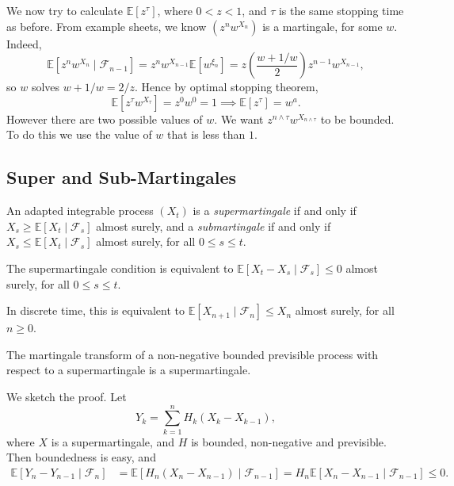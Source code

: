 \documentclass[12pt]{article}
\begin{document}
\begin{exbox}
	We now try to calculate $\mathbb{E}[z^{\tau}]$, where $0 < z < 1$, and $\tau$ is the same stopping time as before. From example sheets, we know $(z^n w^{X_n})$ is a martingale, for some $w$. Indeed,
	\[
	\mathbb{E}[z^n w^{X_n} \mid \mathcal{F}_{n-1}] = z^n w^{X_{n-1}} \mathbb{E}[w^{\xi_n}] = z \left( \frac{w + 1/w}{2} \right) z^{n-1} w^{X_{n-1}},
	\]
	so $w$ solves $w + 1/w = 2/z$. Hence by optimal stopping theorem,
	\[
	\mathbb{E}[z^\tau w^{X_\tau}] = z^0 w^0 = 1 \implies \mathbb{E}[z^\tau] = w^a.
	\]
	However there are two possible values of $w$. We want $z^{n \wedge \tau} w^{X_{n \wedge \tau}}$ to be bounded. To do this we use the value of $w$ that is less than $1$.
\end{exbox}


\subsection{Super and Sub-Martingales}
\label{sub:ss_mart}

\begin{definition}
	An adapted integrable process $(X_t)$ is a \emph{supermartingale} if and only if $X_s \geq \mathbb{E}[X_t \mid \mathcal{F}_s]$ almost surely, and a \emph{submartingale} if and only if $X_s \leq \mathbb{E}[X_t \mid \mathcal{F}_s]$ almost surely, for all $0 \leq s \leq t$.
\end{definition}

\begin{remark}
	The supermartingale condition is equivalent to $\mathbb{E}[X_t - X_s \mid \mathcal{F}_s] \leq 0$ almost surely, for all $0 \leq s \leq t$.

	In discrete time, this is equivalent to $\mathbb{E}[X_{n+1} \mid \mathcal{F}_n] \leq X_n$ almost surely, for all $n \geq 0$.
\end{remark}

\begin{theorem}
	The martingale transform of a non-negative bounded previsible process with respect to a supermartingale is a supermartingale.
\end{theorem}

\begin{proofbox}
	We sketch the proof. Let
	\[
	Y_k = \sum_{k = 1}^n H_k (X_k - X_{k-1}),
	\]
	where $X$ is a supermartingale, and $H$ is bounded, non-negative and previsible. Then boundedness is easy, and
	\begin{align*}
		\mathbb{E}[Y_n - Y_{n-1} \mid \mathcal{F}_n] &= \mathbb{E}[H_n(X_n - X_{n-1}) \mid \mathcal{F}_{n-1}] = H_n \mathbb{E}[X_n - X_{n-1} \mid \mathcal{F}_{n-1}] \leq 0.
	\end{align*}
\end{proofbox}
\end{document}
